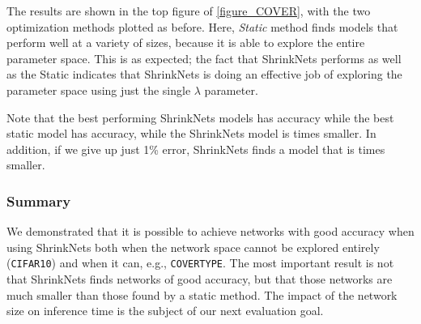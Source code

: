 The results are shown in the top figure of \cref{figure_COVER}, with the two
optimization methods plotted as before. Here, {\it Static} method finds models
that perform well at a variety of sizes, because it is able to explore the
entire parameter space.  This is as expected;  the fact that ShrinkNets performs
as well as the Static indicates that ShrinkNets is doing an effective job of
exploring the parameter space using just the single $\lambda$ parameter.

Note that the best performing ShrinkNets models has  accuracy while the
best static model has  accuracy, while the ShrinkNets model is 
times smaller. In addition, if we give up just 1\% error, ShrinkNets finds a
model that is  times smaller. 


\subsubsection{Summary}

We  demonstrated that it is possible to achieve networks with good accuracy
when using ShrinkNets both when the network space cannot be explored entirely
(\texttt{CIFAR10}) and when it can, e.g., \texttt{COVERTYPE}. The most important
result is not that ShrinkNets finds networks of good accuracy, but that those
networks are much smaller than those found by a static method. The impact of the
network size on inference time is the subject of our next evaluation goal.

%
%
%

